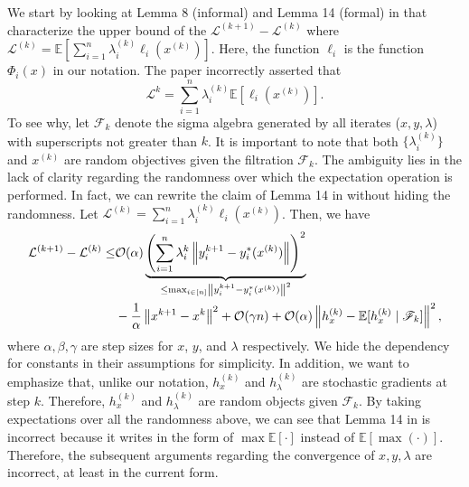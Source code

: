 \documentclass[10pt]{article}
\theoremstyle{remark}
\newcommand{\cL}{\mathcal{L}}
\newcommand{\cO}{\mathcal{O}}
\def\setF{\mathscr{F}} %
\newcommand{\E}{\mathbb{E}}
\newcommand{\norm}[1]{\left\|#1\right\|}
\begin{document}
We start by looking at Lemma 8 (informal) and Lemma 14 (formal) in \cite{gu2022min} that characterize the upper bound of the $\cL^{(k+1)} - \cL^{(k)}$ where $\cL^{(k)} = \E[\sum_{i=1}^{n}\lambda_i^{(k)}\ell_i(x^{(k)})]$. Here, the function $\ell_i$ is the function $\Phi_i(x)$ in our notation. The paper incorrectly asserted that $$\cL^{k} = \sum_{i=1}^{n}\lambda_i^{(k)}\E[\ell_i(x^{(k)})].$$ 
To see why, let $\setF_k$ denote the sigma algebra generated by all iterates ($x, y, \lambda$) with superscripts not greater than $k$. It is important to note that both $\{\lambda_i^{(k)}\}$ and $x^{(k)}$ are random objectives given the filtration 
$\setF_{k}$. The ambiguity lies in the lack of clarity regarding the randomness over which the expectation operation is performed. In fact, we can rewrite the claim of Lemma 14 in \cite{gu2022min} without hiding the randomness. Let $\cL^{(k)} = \sum_{i=1}^{n} \lambda_i^{(k)} \ell_i(x^{(k)})$. Then, we have
\begin{align}
    \cL^{(k+1)} - \cL^{(k)} \label{eq: appendix-c problem 1} \leq & \cO(\alpha) \underbrace{\left(\sum_{i=1}^{n} \lambda_i^k \norm{y_i^{k+1} - y_i^*(x^{(k)})} \right)^2}_{\leq \max_{i\in[n]}\norm{y_i^{k+1} - y_i^*(x^{(k)})}^2} \\
    &- \frac{1}{\alpha} \norm{x^{k+1} - x^{k}}^2 + \cO(\gamma n) + \cO(\alpha) \norm{h_{x}^{(k)} - \E[h_{x}^{(k)}\mid \setF_k]}^2,\notag
\end{align}
where $\alpha,\beta, \gamma$ are step sizes for $x$, $y$, and $\lambda$ respectively. We hide the dependency for constants in their assumptions for simplicity. In addition, we want to emphasize that, unlike our notation, $h_x^{(k)}$ and $h_\lambda^{(k)}$ are stochastic gradients at step $k$. Therefore, $h_x^{(k)}$ and $h_\lambda^{(k)}$ are random objects given $\setF_k$. By taking expectations over all the randomness above, we can see that Lemma 14 in \cite{gu2022min} is incorrect because it writes in the form of $\max\E[\cdot]$ instead of $\E[\max(\cdot)]$. Therefore, the subsequent arguments regarding the convergence of $x,y,\lambda$ are incorrect, at least in the current form. 
\end{document}
